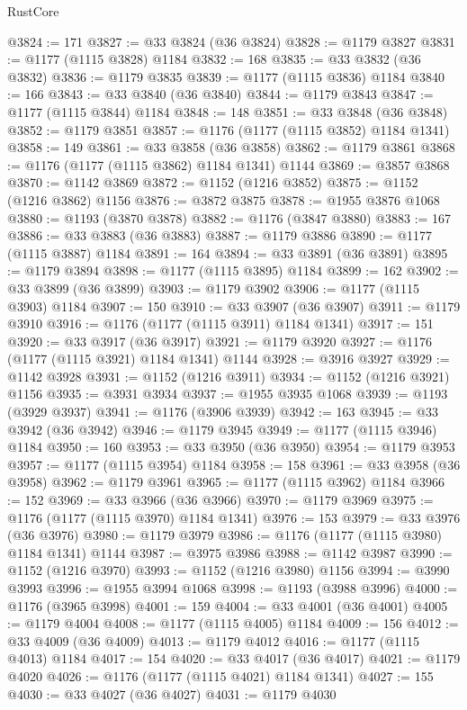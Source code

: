 \begin{lexlean}{RustCore}
\begin{coremodule}
@3824 := 171
@3827 := @33 @3824 (@36 @3824)
@3828 := @1179 @3827
@3831 := @1177 (@1115 @3828) @1184
@3832 := 168
@3835 := @33 @3832 (@36 @3832)
@3836 := @1179 @3835
@3839 := @1177 (@1115 @3836) @1184
@3840 := 166
@3843 := @33 @3840 (@36 @3840)
@3844 := @1179 @3843
@3847 := @1177 (@1115 @3844) @1184
@3848 := 148
@3851 := @33 @3848 (@36 @3848)
@3852 := @1179 @3851
@3857 := @1176 (@1177 (@1115 @3852) @1184 @1341)
@3858 := 149
@3861 := @33 @3858 (@36 @3858)
@3862 := @1179 @3861
@3868 := @1176 (@1177 (@1115 @3862) @1184 @1341) @1144
@3869 := @3857 @3868
@3870 := @1142 @3869
@3872 := @1152 (@1216 @3852)
@3875 := @1152 (@1216 @3862) @1156
@3876 := @3872 @3875
@3878 := @1955 @3876 @1068
@3880 := @1193 (@3870 @3878)
@3882 := @1176 (@3847 @3880)
@3883 := 167
@3886 := @33 @3883 (@36 @3883)
@3887 := @1179 @3886
@3890 := @1177 (@1115 @3887) @1184
@3891 := 164
@3894 := @33 @3891 (@36 @3891)
@3895 := @1179 @3894
@3898 := @1177 (@1115 @3895) @1184
@3899 := 162
@3902 := @33 @3899 (@36 @3899)
@3903 := @1179 @3902
@3906 := @1177 (@1115 @3903) @1184
@3907 := 150
@3910 := @33 @3907 (@36 @3907)
@3911 := @1179 @3910
@3916 := @1176 (@1177 (@1115 @3911) @1184 @1341)
@3917 := 151
@3920 := @33 @3917 (@36 @3917)
@3921 := @1179 @3920
@3927 := @1176 (@1177 (@1115 @3921) @1184 @1341) @1144
@3928 := @3916 @3927
@3929 := @1142 @3928
@3931 := @1152 (@1216 @3911)
@3934 := @1152 (@1216 @3921) @1156
@3935 := @3931 @3934
@3937 := @1955 @3935 @1068
@3939 := @1193 (@3929 @3937)
@3941 := @1176 (@3906 @3939)
@3942 := 163
@3945 := @33 @3942 (@36 @3942)
@3946 := @1179 @3945
@3949 := @1177 (@1115 @3946) @1184
@3950 := 160
@3953 := @33 @3950 (@36 @3950)
@3954 := @1179 @3953
@3957 := @1177 (@1115 @3954) @1184
@3958 := 158
@3961 := @33 @3958 (@36 @3958)
@3962 := @1179 @3961
@3965 := @1177 (@1115 @3962) @1184
@3966 := 152
@3969 := @33 @3966 (@36 @3966)
@3970 := @1179 @3969
@3975 := @1176 (@1177 (@1115 @3970) @1184 @1341)
@3976 := 153
@3979 := @33 @3976 (@36 @3976)
@3980 := @1179 @3979
@3986 := @1176 (@1177 (@1115 @3980) @1184 @1341) @1144
@3987 := @3975 @3986
@3988 := @1142 @3987
@3990 := @1152 (@1216 @3970)
@3993 := @1152 (@1216 @3980) @1156
@3994 := @3990 @3993
@3996 := @1955 @3994 @1068
@3998 := @1193 (@3988 @3996)
@4000 := @1176 (@3965 @3998)
@4001 := 159
@4004 := @33 @4001 (@36 @4001)
@4005 := @1179 @4004
@4008 := @1177 (@1115 @4005) @1184
@4009 := 156
@4012 := @33 @4009 (@36 @4009)
@4013 := @1179 @4012
@4016 := @1177 (@1115 @4013) @1184
@4017 := 154
@4020 := @33 @4017 (@36 @4017)
@4021 := @1179 @4020
@4026 := @1176 (@1177 (@1115 @4021) @1184 @1341)
@4027 := 155
@4030 := @33 @4027 (@36 @4027)
@4031 := @1179 @4030

\end{coremodule}
\end{lexlean}
